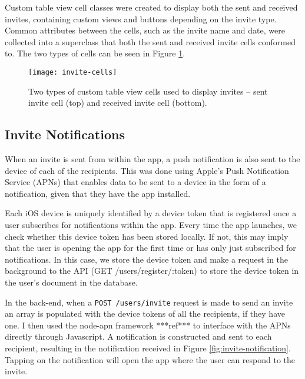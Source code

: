 Custom table view cell classes were created to display both the sent and received invites, containing custom views and buttons depending on the invite type. Common attributes between the cells, such as the invite name and date, were collected into a superclass that both the sent and received invite cells conformed to. The two types of cells can be seen in Figure \ref{fig:invite-cells}.

\begin{figure}[hbt]
  \centering
  \texttt{[image: invite-cells]}
  \caption{Two types of custom table view cells used to display invites -- sent invite cell (top) and received invite cell (bottom).}
  \label{fig:invite-cells}
\end{figure}

\subsection{Invite Notifications} \label{subsection:invite-notifications}


When an invite is sent from within the app, a push notification is also sent to the device of each of the recipients. This was done using Apple's Push Notification Service (APNs) that enables data to be sent to a device in the form of a notification, given that they have the app installed.

Each iOS device is uniquely identified by a device token that is registered once a user subscribes for notifications within the app. Every time the app launches, we check whether this device token has been stored locally. If not, this may imply that the user is opening the app for the first time or has only just subscribed for notifications. In this case, we store the device token and make a request in the background to the API (GET /users/register/:token) to store the device token in the user's document in the database.

In the back-end, when a \verb|POST /users/invite| request is made to send an invite an array is populated with the device tokens of all the recipients, if they have one. I then used the node-apn framework ***ref*** to interface with the APNs directly through Javascript. A notification is constructed and sent to each recipient, resulting in the notification received in Figure \ref{fig:invite-notification}. Tapping on the notification will open the app where the user can respond to the invite.


